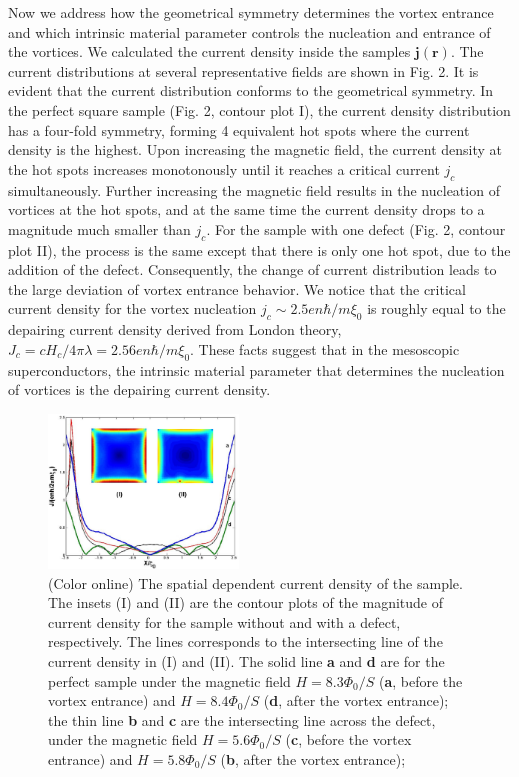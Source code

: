 \documentclass[aps,prl,showpacs,twocolumn]{revtex4}
\begin{document}
Now we address how the geometrical symmetry determines the vortex
entrance and which intrinsic material parameter controls the
nucleation and entrance of the vortices. We calculated the current
density inside the samples $\textbf{j}(\textbf{r})$. The current
distributions at several representative fields are shown in Fig. 2.
It is evident that the current distribution conforms to the
geometrical symmetry. In the perfect square sample (Fig. 2, contour
plot I), the current density distribution has a four-fold symmetry,
forming 4 equivalent hot spots where the current density is the
highest. Upon increasing the magnetic field, the current density at
the hot spots increases monotonously until it reaches a critical
current $j_c$ simultaneously. Further increasing the magnetic field
results in the nucleation of vortices at the hot spots, and at the
same time the current density drops to a magnitude much smaller than
$j_c$. For the sample with one defect (Fig. 2, contour plot II), the
process is the same except that there is only one hot spot, due to
the addition of the defect. Consequently, the change of current
distribution leads to the large deviation of vortex entrance
behavior. We notice that the critical current density for the vortex
nucleation $j_c\sim2.5en\hbar/m\xi_0$ is roughly equal to the
depairing current density derived from London theory,
$J_c=cH_c/4\pi\lambda=2.56en\hbar/m\xi_0$. These facts suggest that
in the mesoscopic superconductors, the intrinsic material parameter
that determines the nucleation of vortices is the depairing current
density.

\begin{figure}[tbp]
\centering
\renewcommand{\figurename}{FIG. }
\includegraphics[width=0.45\textwidth]{Fig2.eps}
\caption{(Color online) The spatial dependent current density of the
sample. The insets (I) and (II) are the contour plots of the
magnitude of current density for the sample without and with a
defect, respectively. The lines corresponds to the intersecting line
of the current density in (I) and (II). The solid line \textbf{a}
and \textbf{d} are for the perfect sample under the magnetic field
$H=8.3\Phi_0/S$ (\textbf{a}, before the vortex entrance) and
$H=8.4\Phi_0/S$ (\textbf{d}, after the vortex entrance); the thin
line \textbf{b} and \textbf{c} are the intersecting line across the
defect, under the magnetic field $H=5.6\Phi_0/S$ (\textbf{c}, before
the vortex entrance) and $H=5.8\Phi_0/S$ (\textbf{b}, after the
vortex entrance);}
\end{figure}
\end{document}
